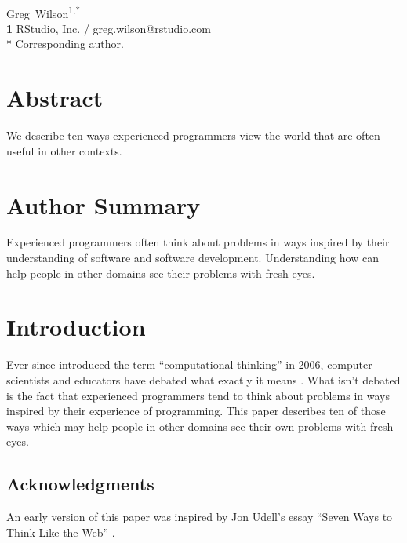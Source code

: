 \documentclass[10pt,letterpaper]{article}
\begin{document}
\vspace*{0.2in}

\begin{flushleft}
{\Large
\textbf{}
}
\newline
\\
{Greg~Wilson}\textsuperscript{1,*}
\\
\textbf{1} RStudio, Inc. / greg.wilson@rstudio.com
\\
\bigskip
* Corresponding author.
\end{flushleft}

\section*{Abstract}

We describe ten ways experienced programmers view the world that are often
useful in other contexts.

\section*{Author Summary}

Experienced programmers often think about problems in ways inspired by their
understanding of software and software development.  Understanding how can help
people in other domains see their problems with fresh eyes.

\section*{Introduction}

Ever since \cite{Wing2006} introduced the term ``computational thinking'' in
2006, computer scientists and educators have debated what exactly it means
\cite{Denn2017}.  What isn't debated is the fact that experienced programmers
tend to think about problems in ways inspired by their experience of
programming.  This paper describes ten of those ways which may help people in
other domains see their own problems with fresh eyes.

\subsection*{Acknowledgments}

An early version of this paper was inspired by Jon Udell's essay ``Seven Ways to
Think Like the Web'' \cite{Udel2011}.
\end{document}
